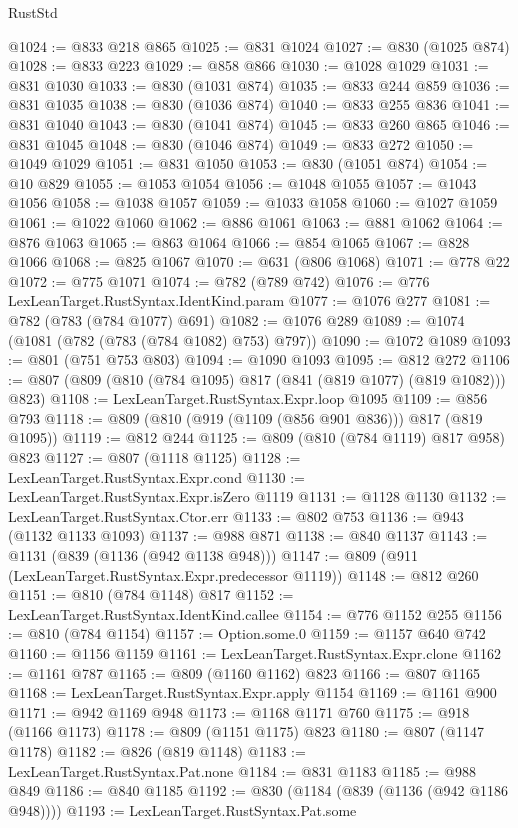 \begin{lexlean}{RustStd}
\begin{coremodule}
@1024 := @833 @218 @865
@1025 := @831 @1024
@1027 := @830 (@1025 @874)
@1028 := @833 @223
@1029 := @858 @866
@1030 := @1028 @1029
@1031 := @831 @1030
@1033 := @830 (@1031 @874)
@1035 := @833 @244 @859
@1036 := @831 @1035
@1038 := @830 (@1036 @874)
@1040 := @833 @255 @836
@1041 := @831 @1040
@1043 := @830 (@1041 @874)
@1045 := @833 @260 @865
@1046 := @831 @1045
@1048 := @830 (@1046 @874)
@1049 := @833 @272
@1050 := @1049 @1029
@1051 := @831 @1050
@1053 := @830 (@1051 @874)
@1054 := @10 @829
@1055 := @1053 @1054
@1056 := @1048 @1055
@1057 := @1043 @1056
@1058 := @1038 @1057
@1059 := @1033 @1058
@1060 := @1027 @1059
@1061 := @1022 @1060
@1062 := @886 @1061
@1063 := @881 @1062
@1064 := @876 @1063
@1065 := @863 @1064
@1066 := @854 @1065
@1067 := @828 @1066
@1068 := @825 @1067
@1070 := @631 (@806 @1068)
@1071 := @778 @22
@1072 := @775 @1071
@1074 := @782 (@789 @742)
@1076 := @776 LexLeanTarget.RustSyntax.IdentKind.param
@1077 := @1076 @277
@1081 := @782 (@783 (@784 @1077) @691)
@1082 := @1076 @289
@1089 := @1074 (@1081 (@782 (@783 (@784 @1082) @753) @797))
@1090 := @1072 @1089
@1093 := @801 (@751 @753 @803)
@1094 := @1090 @1093
@1095 := @812 @272
@1106 := @807 (@809 (@810 (@784 @1095) @817 (@841 (@819 @1077) (@819 @1082))) @823)
@1108 := LexLeanTarget.RustSyntax.Expr.loop @1095
@1109 := @856 @793
@1118 := @809 (@810 (@919 (@1109 (@856 @901 @836))) @817 (@819 @1095))
@1119 := @812 @244
@1125 := @809 (@810 (@784 @1119) @817 @958) @823
@1127 := @807 (@1118 @1125)
@1128 := LexLeanTarget.RustSyntax.Expr.cond
@1130 := LexLeanTarget.RustSyntax.Expr.isZero @1119
@1131 := @1128 @1130
@1132 := LexLeanTarget.RustSyntax.Ctor.err
@1133 := @802 @753
@1136 := @943 (@1132 @1133 @1093)
@1137 := @988 @871
@1138 := @840 @1137
@1143 := @1131 (@839 (@1136 (@942 @1138 @948)))
@1147 := @809 (@911 (LexLeanTarget.RustSyntax.Expr.predecessor @1119))
@1148 := @812 @260
@1151 := @810 (@784 @1148) @817
@1152 := LexLeanTarget.RustSyntax.IdentKind.callee
@1154 := @776 @1152 @255
@1156 := @810 (@784 @1154)
@1157 := Option.some.{0}
@1159 := @1157 @640 @742
@1160 := @1156 @1159
@1161 := LexLeanTarget.RustSyntax.Expr.clone
@1162 := @1161 @787
@1165 := @809 (@1160 @1162) @823
@1166 := @807 @1165
@1168 := LexLeanTarget.RustSyntax.Expr.apply @1154
@1169 := @1161 @900
@1171 := @942 @1169 @948
@1173 := @1168 @1171 @760
@1175 := @918 (@1166 @1173)
@1178 := @809 (@1151 @1175) @823
@1180 := @807 (@1147 @1178)
@1182 := @826 (@819 @1148)
@1183 := LexLeanTarget.RustSyntax.Pat.none
@1184 := @831 @1183
@1185 := @988 @849
@1186 := @840 @1185
@1192 := @830 (@1184 (@839 (@1136 (@942 @1186 @948))))
@1193 := LexLeanTarget.RustSyntax.Pat.some

\end{coremodule}
\end{lexlean}
